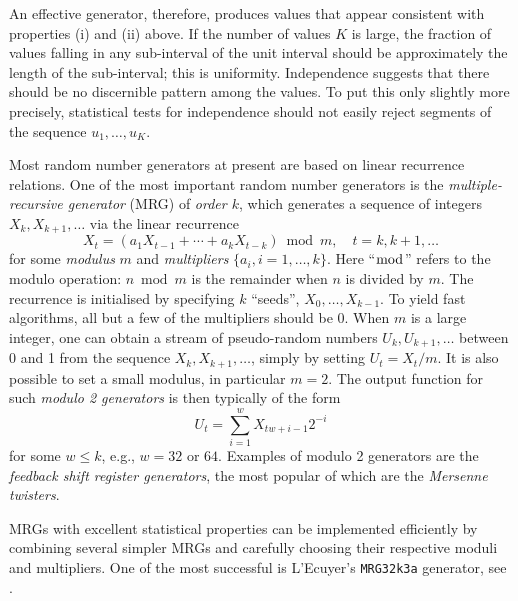 An effective generator, therefore, produces values that appear consistent with properties (i) and (ii) above. If the number of values \(K\) is large, the fraction of values falling in any sub-interval of the unit interval should be approximately the length of the sub-interval; this is uniformity. Independence suggests that there should be no discernible pattern among the values. To put this only slightly more precisely, statistical tests for independence should not easily reject segments of the sequence \(u_1, \dots, u_K\).

Most random number generators at present are based on linear recurrence relations. One of the most important random number generators is the \textit{multiple-recursive generator} (MRG) of \textit{order \(k\)}, which generates a sequence of integers \(X_k, X_{k+1}, \dots\) via the linear recurrence
\begin{equation} \label{eq:MRGRecurrence}
X_t = (a_1 X_{t-1} + \cdots + a_k X_{t-k}) \bmod m, \quad t = k, k+1, \ldots
\end{equation}
for some \textit{modulus} \(m\) and \textit{multipliers} \(\{a_i, i = 1, \dots, k\}\). Here ``\(\bmod\)'' refers to the modulo operation: \(n \bmod m\) is the remainder when \(n\) is divided by \(m\). The recurrence is initialised by specifying \(k\) ``seeds'', \(X_0, \dots, X_{k-1}\). To yield fast algorithms, all but a few of the multipliers should be 0. When \(m\) is a large integer, one can obtain a stream of pseudo-random numbers \(U_k, U_{k+1}, \dots\) between 0 and 1 from the sequence \(X_k, X_{k+1}, \dots\), simply by setting \(U_t = X_t/m\). It is also possible to set a small modulus, in particular \(m=2\). The output function for such \textit{modulo 2 generators} is then typically of the form
\begin{equation} \label{eq:Modulo2OutputFunction}
	U_t = \sum_{i=1}^w X_{tw+i-1} 2^{-i}
\end{equation}
for some \(w \le k\), e.g., \(w=32\) or \(64\). Examples of modulo 2 generators are the \textit{feedback shift register generators}, the most popular of which are the \textit{Mersenne twisters}.



MRGs with excellent statistical properties can be implemented efficiently by combining several simpler MRGs and carefully choosing their respective moduli and multipliers. One of the most successful is L'Ecuyer's \texttt{MRG32k3a} generator, see \citep{lecuyer_good_1999}.

